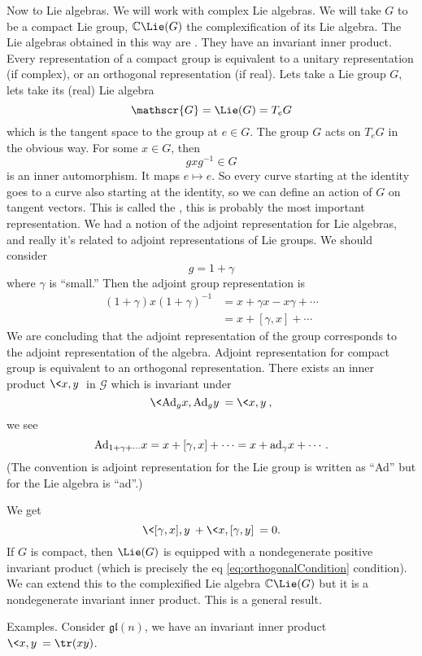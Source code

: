Now to Lie algebras. We will work with complex Lie algebras. We
will take $G$ to be a compact Lie group, $\Bbb{C}\Lie(G)$ the
complexification of its Lie algebra. The Lie algebras obtained in
this way are %
. They have an invariant inner
product. Every representation of a compact group is equivalent to
a unitary representation (if complex), or an orthogonal
representation (if real). Lets take a Lie group $G$, lets take
its (real) Lie algebra 
\begin{equation}
\mathscr{G}=\Lie(G)=T_{e}G
\end{equation}
which is the tangent space to the group at $e\in G$. The group
$G$ acts on $T_{e}G$ in the obvious way. For some $x\in G$, then
\begin{equation}
gxg^{-1}\in G
\end{equation}
is an inner automorphism. It maps $e\mapsto e$. So every curve
starting at the identity goes to a curve also starting at the
identity, so we can define an action of $G$ on tangent
vectors. This is called the ,
this is probably the most important representation. We had a
notion of the adjoint representation for Lie algebras, and really
it's related to adjoint representations of Lie groups. We should
consider
\begin{equation}
g=1+\gamma
\end{equation}
where $\gamma$ is ``small.'' Then the adjoint group
representation is
\begin{subequations}
\begin{align}
(1+\gamma)x(1+\gamma)^{-1}&=x+\gamma x-x\gamma+\cdots \\
&= x + [\gamma,x] + \cdots
\end{align}
\end{subequations}
We are concluding that the adjoint representation of the group
corresponds to the adjoint representation of the algebra. Adjoint
representation for compact group is equivalent to an orthogonal
representation. There exists an inner product $\<x,y\>$ in
$\mathscr{G}$ which is invariant under
\begin{equation}
\<{\rm Ad}_{g}x,{\rm Ad}_{g}y\> = \<x,y\>,
\end{equation}
we see
\begin{equation}
{\rm Ad}_{1+\gamma+\cdots}x = x + [\gamma,x] + \cdots = x + {\rm
  ad}_{\gamma}x + \cdots.
\end{equation}
(The convention is adjoint representation for the Lie group is
written as ``Ad'' but for the Lie algebra is ``ad''.)

We get
\begin{equation}\label{eq:orthogonalCondition}
\<[\gamma,x],y\>+\<x,[\gamma,y]\>=0.
\end{equation}
If $G$ is compact, then $\Lie(G)$ is equipped with a
nondegenerate positive invariant product (which is precisely 
the eq \eqref{eq:orthogonalCondition} condition). We can extend
this to the complexified Lie algebra $\Bbb{C}\Lie(G)$ but it is a
nondegenerate invariant inner product. This is a general result.

Examples. Consider $\mathfrak{gl}(n)$, we have an invariant inner
product $\<x,y\>=\tr(xy)$.
